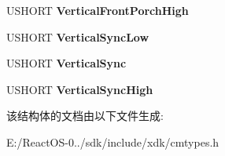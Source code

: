 \begin{DoxyCompactItemize}
U\+S\+H\+O\+RT {\bfseries Vertical\+Front\+Porch\+High}
\item 
\mbox{\label{struct___c_m___m_o_n_i_t_o_r___d_e_v_i_c_e___d_a_t_a_aa76149f2bb86357d9b3eecb842dcdacd}} 
U\+S\+H\+O\+RT {\bfseries Vertical\+Sync\+Low}
\item 
\mbox{\label{struct___c_m___m_o_n_i_t_o_r___d_e_v_i_c_e___d_a_t_a_a14a5e3730dbf05330cd9709a05ad87e2}} 
U\+S\+H\+O\+RT {\bfseries Vertical\+Sync}
\item 
\mbox{\label{struct___c_m___m_o_n_i_t_o_r___d_e_v_i_c_e___d_a_t_a_ad27ece1a6961c24e653ca1bb21b766ce}} 
U\+S\+H\+O\+RT {\bfseries Vertical\+Sync\+High}
\end{DoxyCompactItemize}


该结构体的文档由以下文件生成\+:\begin{DoxyCompactItemize}
\item 
E\+:/\+React\+O\+S-\/0../sdk/include/xdk/cmtypes.\+h\end{DoxyCompactItemize}
